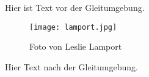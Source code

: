 Hier ist Text vor der Gleitumgebung.

\begin{figure}[bth]
\texttt{[image: lamport.jpg]}
\caption{Foto von Leslie Lamport}
\end{figure}

Hier Text nach der Gleitumgebung.